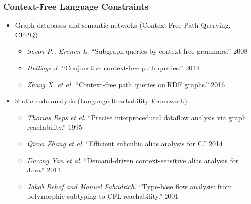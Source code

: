 \documentclass[xcolor=table]{beamer}
\begin{document}
\begin{frame}[fragile]
  \transwipe[direction=90]
  \frametitle{Context-Free Language Constraints}
  \begin{itemize}
  \item Graph databases and semantic networks (Context-Free Path Querying, CFPQ)
    \begin{itemize}
        \item \emph{Sevon P., Eronen L.} ``Subgraph queries by context-free grammars.'' 2008
        \item \emph{Hellings J.} ``Conjunctive context-free path queries.'' 2014
        \item \emph{Zhang X. et al.} ``Context-free path queries on RDF graphs.'' 2016
    \end{itemize}
    \item Static code analysis (Language Reachability Framework)
    \begin{itemize}
        \item \emph{Thomas Reps et al.} ``Precise interprocedural dataflow analysis via graph reachability.'' 1995 
        \item \emph{Qirun Zhang et al.}  ``Efficient subcubic alias analysis for C.'' 2014
        \item \emph{Dacong Yan et al.} ``Demand-driven context-sensitive alias analysis for Java.'' 2011
        \item \emph{Jakob Rehof and Manuel Fahndrich.} ``Type-base flow analysis: from polymorphic subtyping to CFL-reachability.'' 2001
    \end{itemize}
  \end{itemize}
\end{frame}


%
%  
%
%
\end{document}
